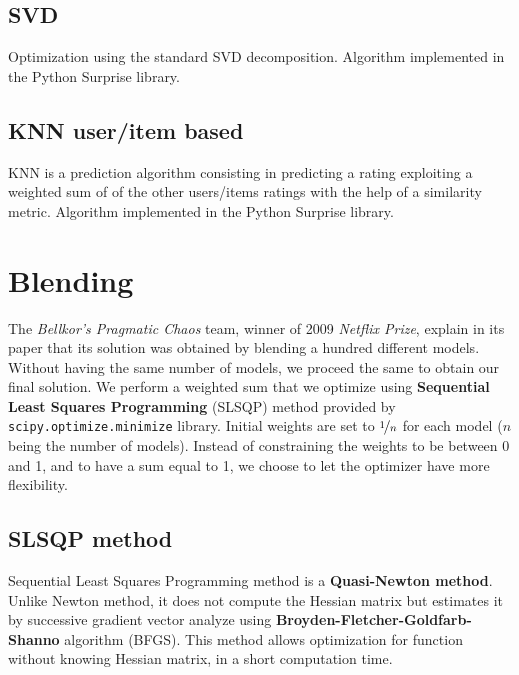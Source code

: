 \documentclass[10pt,conference,compsocconf]{IEEEtran}
\begin{document}
\subsection{SVD}
Optimization using the standard SVD decomposition. Algorithm implemented in the Python Surprise library. \cite{library:surprise}

\subsection{KNN user/item based}
KNN is a prediction algorithm consisting in predicting a rating exploiting a weighted sum of 
of the other users/items ratings with the help of a similarity metric. Algorithm implemented in the Python Surprise library. \cite{library:surprise}


\section{Blending}
\label{sec:blending}

The \textit{Bellkor's Pragmatic Chaos} team, winner of 2009 \textit{Netflix Prize}, explain in its paper that its solution was obtained by blending a hundred different models. \cite{BellKore_netflix} Without having the same number of models, we proceed the same to obtain our final solution. We perform a weighted sum that we optimize using \textbf{Sequential Least Squares Programming} (SLSQP) method provided by \texttt{scipy.optimize.minimize} library. Initial weights are set to $\nicefrac{1}{n}$ for each model ($n$ being the number of models). Instead of constraining the weights to be between 0 and 1, and to have a sum equal to 1, we choose to let the optimizer have more flexibility.

\subsection{SLSQP method}
\label{SLSQP}
Sequential Least Squares Programming method is a \textbf{Quasi-Newton method}. Unlike Newton method, it does not compute the Hessian matrix but estimates it by successive gradient vector analyze \cite{wiki:quasi_newton} using \textbf{Broyden-Fletcher-Goldfarb-Shanno} algorithm (BFGS). This method allows optimization for function without knowing Hessian matrix, in a short computation time.
\end{document}
